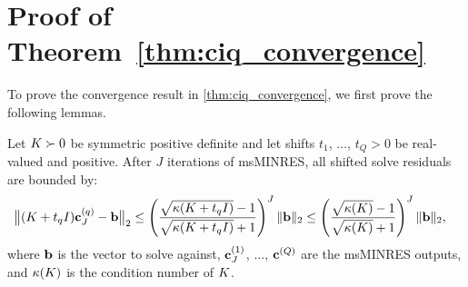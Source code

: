 \section{Proof of Theorem~\ref{thm:ciq_convergence}}
\label{app:ciq_proofs}

To prove the convergence result in \cref{thm:ciq_convergence}, we first prove the following lemmas.

\begin{lemma}
  Let $K \succ 0$ be symmetric positive definite and let shifts $t_1$, $\ldots$, $t_Q > 0$ be real-valued and positive.
  After $J$ iterations of msMINRES, all shifted solve residuals are bounded by:
  \begin{align*}
    \bigl\Vert (K + t_q I) \mathbf{c}_J^{(q)} - \mathbf{b} \bigr\Vert_2
    &\leq \left( \frac{
      \sqrt{\kappa(K + t_q I)} - 1
    }{
      \sqrt{\kappa(K + t_q I)} + 1
    }\right)^J
    \Vert \mathbf{b} \Vert_2
    \leq \left( \frac{
      \sqrt{\kappa(K)} - 1
    }{
      \sqrt{\kappa(K)} + 1
    }\right)^J
    \Vert \mathbf{b} \Vert_2,
	\end{align*}
  where $\mathbf{b}$ is the vector to solve against, $\mathbf{c}^{(1)}_J$, $\ldots$, $\mathbf{c}^{(Q)}$ are the msMINRES outputs, and $\kappa(K)$ is the condition number of $K$.
  \label{lemma:minres}
\end{lemma}
%

